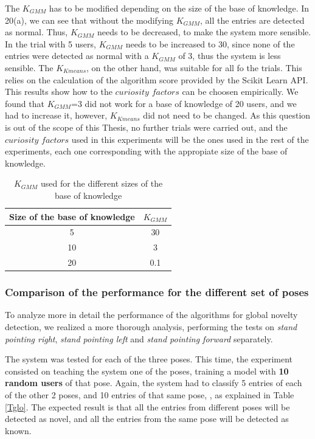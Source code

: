 The $ K_{GMM} $ has to be modified depending on the size of the base of knowledge. In 20(a), we can see that without the modifying $ K_{GMM} $, all the entries are detected as normal. Thus, $ K_{GMM} $ needs to be decreased, to make the system more sensible. In the trial with 5 users, $ K_{GMM} $ needs to be increased to 30, since none of the entries were detected as normal with a $ K_{GMM} $ of 3, thus the system is less sensible. The $ K_{Kmeans} $, on the other hand, was suitable for all fo the trials. This relies on the calculation of the algorithm score provided by the Scikit Learn API. This results show how to the $curiosity$ $factors$ can be choosen empirically. We found that $ K_{GMM} $=3 did not work for a base of knowledge of 20 users, and we had to increase it, however,  $ K_{Kmeans} $ did not need to be changed. As this question is out of the scope of this Thesis, no further trials were carried out, and the $curiosity$ $factors$ used in this experiments will be the ones used in the rest of the experiments, each one corresponding with the appropiate size of the base of knowledge.

\begin{table}[h]
    \begin{tabular}{cc}
    \hline
    Size of the base of knowledge & $ K_{GMM} $ \\ 
    \hline
    5 & 30 \\
    10 & 3 \\
    20 & 0.1 \\
    \hline 
    \end{tabular}
    \centering
    \caption{$ K_{GMM} $ used for the different sizes of the base of knowledge}
\end{table} 

\subsubsection{Comparison of the performance for the different set of poses}

To analyze more in detail the performance of the algorithms for global novelty detection, we realized a more thorough analysis, performing the tests on \emph{stand pointing right}, \emph{stand pointing left} and \emph{stand pointing forward} separately. 

The system was tested for each of the three poses. This time, the experiment consisted on teaching the system one of the poses, training a model with \textbf{10 random users} of that pose. Again, the system had to classify 5 entries of each of the other 2 poses, and 10 entries of that same pose, , as explained in Table \ref{Tglo}. The expected result is that all the entries from different poses will be detected as novel, and all the entries from the same pose will be detected as known.

